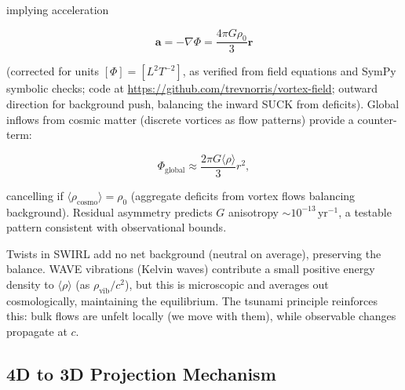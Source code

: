 implying acceleration

\begin{equation}
\mathbf{a} = -\nabla \Phi = \frac{4\pi G \rho_0}{3} \mathbf{r}
\end{equation}

(corrected for units $[\Phi] = [L^2 T^{-2}]$, as verified from field equations and SymPy symbolic checks; code at \url{https://github.com/trevnorris/vortex-field}; outward direction for background push, balancing the inward SUCK from deficits). Global inflows from cosmic matter (discrete vortices as flow patterns) provide a counter-term:

\begin{equation}
\Phi_{\text{global}} \approx \frac{2\pi G \langle \rho \rangle}{3} r^2,
\end{equation}

cancelling if $\langle \rho_{\text{cosmo}} \rangle = \rho_0$ (aggregate deficits from vortex flows balancing background). Residual asymmetry predicts $G$ anisotropy $\sim 10^{-13} \,\mathrm{yr}^{-1}$, a testable pattern consistent with observational bounds.

Twists in SWIRL add no net background (neutral on average), preserving the balance. WAVE vibrations (Kelvin waves) contribute a small positive energy density to $\langle \rho \rangle$ (as $\rho_{\text{vib}} / c^2$), but this is microscopic and averages out cosmologically, maintaining the equilibrium. The tsunami principle reinforces this: bulk flows are unfelt locally (we move with them), while observable changes propagate at $c$.

\medskip
{}
\medskip

\subsection{4D to 3D Projection Mechanism}

